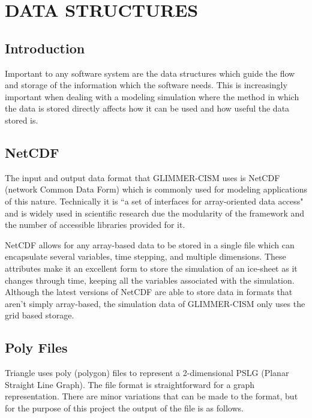 \chapter{DATA STRUCTURES}\label{ch:modelinput}


\section{Introduction}\label{sec:chp3intro}

Important to any software system are the data structures which guide the flow and storage of the information which the software needs.  This is increasingly important when dealing with a modeling simulation where the method in which the data is stored directly affects how it can be used and how useful the data stored is.

\section{NetCDF}\label{sec:chp3netcdf}

The input and output data format that GLIMMER-CISM uses is NetCDF (network Common Data Form) which is commonly used for modeling applications of this nature.  Technically it is ``a set of interfaces for array-oriented data access" and is widely used in scientific research due the modularity of the framework and the number of accessible libraries provided for it. \citep{NetCDF:website}

NetCDF allows for any array-based data to be stored in a single file which can encapsulate several variables, time stepping, and multiple dimensions.  These attributes make it an excellent form to store the simulation of an ice-sheet as it changes through time, keeping all the variables associated with the simulation.  Although the latest versions of NetCDF are able to store data in formats that aren't simply array-based, the simulation data of GLIMMER-CISM only uses the grid based storage.



\section{Poly Files}\label{sec:chp3poly}

Triangle uses poly (polygon) files to represent a 2-dimensional PSLG (Planar Straight Line Graph).  The file format is straightforward for a graph representation.  There are minor variations that can be made to the format, but for the purpose of this project the output of the file is as follows.

